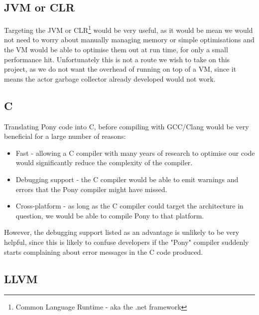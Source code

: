 \documentclass[pdftex,11pt,a4paper]{report}
\begin{document}
\subsection{JVM or CLR}

Targeting the JVM or CLR\footnote{Common Language Runtime - aka the .net framework} would be very useful, as it would be mean we would not need to worry about manually managing memory or simple optimisations and the VM would be able to optimise them out at run time, for only a small performance hit.
Unfortunately this is not a route we wish to take on this project, as we do not want the overhead of running on top of a VM, since it means the actor garbage collector already developed would not work.

\subsection{C}

Translating Pony code into C, before compiling with GCC/Clang would be very beneficial for a large number of reasons:
\begin{itemize}[noitemsep]
\item Fast - allowing a C compiler with many years of research to optimise our code would significantly reduce the complexity of the compiler.
\item Debugging support - the C compiler would be able to emit warnings and errors that the Pony compiler might have missed.
\item Cross-platform - as long as the C compiler could target the architecture in question, we would be able to compile Pony to that platform.
\end{itemize}

However, the debugging support listed as an advantage is unlikely to be very helpful, since this is likely to confuse developers if the "Pony" compiler suddenly starts complaining about error messages in the C code produced.

\subsection{LLVM}
\end{document}
